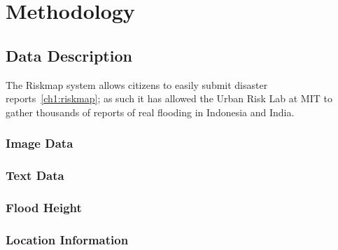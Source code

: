\chapter{Methodology}
\section{Data Description}
The Riskmap system allows citizens to easily submit 
disaster reports~\ref{ch1:riskmap}; as such it has allowed the Urban Risk Lab at
MIT to gather thousands of reports of real flooding in Indonesia and India.

\subsection{Image Data}

\subsection{Text Data}
\subsection{Flood Height}
\subsection{Location Information}

